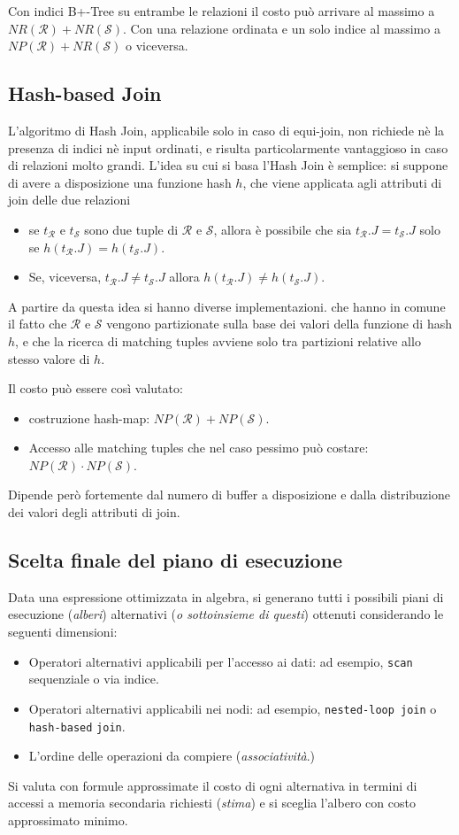 \documentclass[oneside,a4paper,11pt]{book}
\theoremstyle{italicstyle}
\theoremstyle{normStyle}
\begin{document}
Con indici B+-Tree su entrambe le relazioni il costo può arrivare al massimo a 
$NR(\mathcal{R}) + NR(\mathcal{S})$.
Con una relazione ordinata e un solo indice al massimo a $NP(\mathcal{R}) + NR(\mathcal{S})$ o viceversa.
\subsection{Hash-based Join}
L'algoritmo di Hash Join, applicabile solo in caso di equi-join, non richiede nè la presenza di 
indici nè input ordinati, e risulta particolarmente vantaggioso in caso di relazioni molto grandi.
L'idea su cui si basa l'Hash Join è semplice:
si suppone di avere a disposizione una funzione hash $h$, che viene applicata agli attributi di join 
delle due relazioni
\begin{itemize}
  \item se $t_\mathcal{R}$ e $t_\mathcal{S}$ sono due tuple di $\mathcal{R}$ e 
  $\mathcal{S}$, allora è possibile che sia $t_\mathcal{R}.J = t_\mathcal{S}.J$
  solo se $h(t_\mathcal{R}.J) = h(t_\mathcal{S}.J)$.
  \item Se, viceversa, $t_\mathcal{R}.J \not= t_\mathcal{S}.J$
  allora $h(t_\mathcal{R}.J) \not= h(t_\mathcal{S}.J)$.
\end{itemize}
A partire da questa idea si hanno diverse implementazioni. che hanno in comune il fatto che $\mathcal{R}$ e 
$\mathcal{S}$ vengono partizionate sulla base dei valori della funzione di hash $h$, e che 
la ricerca di matching tuples avviene solo tra partizioni relative allo stesso valore di $h$.

Il costo può essere così valutato:
\begin{itemize}
  \item costruzione hash-map: $NP(\mathcal{R}) + NP(\mathcal{S})$.
  \item Accesso alle matching tuples che nel  caso pessimo può costare: $NP(\mathcal{R}) \cdot NP(\mathcal{S})$.
\end{itemize}
Dipende però fortemente dal numero di buffer a disposizione e dalla distribuzione dei valori degli attributi di join.
\subsection{Scelta finale del piano di esecuzione}
Data una espressione ottimizzata in algebra, si generano tutti i possibili piani di esecuzione (\textit{alberi}) 
alternativi (\textit{o sottoinsieme di questi}) ottenuti considerando le seguenti dimensioni:
\begin{itemize}
  \item Operatori alternativi applicabili per l'accesso ai dati: ad esempio, \verb|scan| sequenziale o via indice.
  \item Operatori alternativi applicabili nei nodi: ad esempio, \verb|nested-loop join| o \verb|hash-based| \verb|join|.
  \item L'ordine delle operazioni da compiere (\textit{associatività}.)
\end{itemize}
Si valuta con formule approssimate il costo di ogni alternativa in termini di accessi a 
memoria secondaria richiesti (\textit{stima}) e si sceglia l'albero con costo approssimato minimo.
\end{document}
